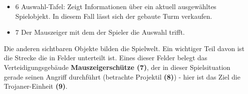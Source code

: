 \begin{itemize}[leftmargin=*]
	\item {$6$ Auswahl-Tafel: Zeigt Informationen über ein aktuell ausgewähltes Spielobjekt.} In diesem Fall lässt sich der gebaute Turm verkaufen.
	\item {$7$ Der Mauszeiger mit dem der Spieler die Auswahl trifft.}
\end{itemize}
Die anderen sichtbaren Objekte bilden die Spielwelt. Ein wichtiger Teil davon ist die Strecke die in Felder unterteilt ist. Eines dieser Felder belegt das Verteidigungsgebäude \textbf{Mauszeigerschütze (7)}, der in dieser Spielsituation gerade seinen Angriff durchführt (betrachte Projektil \textbf{(8)}) - hier ist das Ziel die Trojaner-Einheit \textbf{(9)}.

